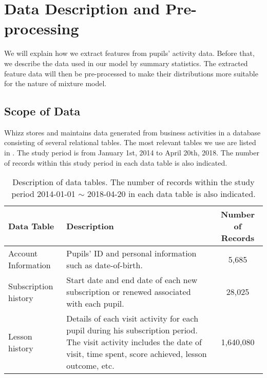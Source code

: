 \section{Data Description and Pre-processing}
\label{sec:data}

We will explain how we extract features from pupils' activity data. Before that, we describe the data used in our model by summary statistics. The extracted feature data will then be pre-processed to make their distributions more suitable for the nature of mixture model. 

\subsection{Scope of Data}

Whizz stores and maintains data generated from business activities in a database consisting of several relational tables. The most relevant tables we use are listed in . The study period is from January 1st, 2014 to April 20th, 2018. The number of records within this study period in each data table is also indicated.

\begin{table}[!h]
\centering
\footnotesize
\begin{tabular}{l|p{7cm}|c}
\hline
\textbf{Data Table} & \textbf{Description} & \textbf{Number of Records} \\
\hline
Account Information &
Pupils' ID and personal information such as date-of-birth. &
5,685 \\
\hline
Subscription history &
Start date and end date of each new subscription or renewed associated with each pupil. &
28,025 \\
\hline
Lesson history &
Details of each visit activity for each pupil during his subscription period. The visit activity includes the date of visit, time spent, score achieved, lesson outcome, etc. &
1,640,080 \\
\hline
\end{tabular}
\caption{Description of data tables. The number of records within the study period 2014-01-01 $\sim$ 2018-04-20 in each data table is also indicated.}
\label{tab:dataTable}
\end{table}

